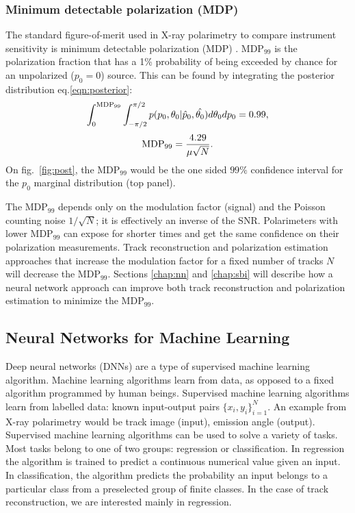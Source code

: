 \subsubsection{Minimum detectable polarization (MDP)}
\label{sec:mdp}

The standard figure-of-merit used in X-ray polarimetry to compare instrument sensitivity is minimum detectable polarization (MDP) \citep{weisskopf_understanding_2010}. MDP$_{99}$ is the polarization fraction that has a 1\% probability of being exceeded by chance for an unpolarized ($p_0 = 0$) source. This can be found by integrating the posterior distribution eq.\ref{eqn:posterior}:
\begin{equation}
    \int_0^{\rm MDP_{99}} \int_{-\pi/2}^{\pi/2} p(p_0, \theta_0 | \hat{p}_0, \hat{\theta_0})d\theta_0 dp_0 = 0.99,
\end{equation}
\begin{equation}
    {\rm MDP}_{99} = \frac{4.29}{\mu\sqrt{N}}.
\end{equation}
On fig.~\ref{fig:post}, the MDP$_{99}$ would be the one sided $99\%$ confidence interval for the $p_0$ marginal distribution (top panel).

The MDP$_{99}$ depends only on the modulation factor (signal) and the Poisson counting noise $1/\sqrt{N}$; it is effectively an inverse of the SNR. Polarimeters with lower MDP$_{99}$ can expose for shorter times and get the same confidence on their polarization measurements. Track reconstruction and polarization estimation approaches that increase the modulation factor for a fixed number of tracks $N$ will decrease the MDP$_{99}$. Sections \ref{chap:nn} and \ref{chap:sbi} will describe how a neural network approach can improve both track reconstruction and polarization estimation to minimize the MDP$_{99}$.

\subsection{Neural Networks for Machine Learning}

Deep neural networks (DNNs) are a type of supervised machine learning algorithm. Machine learning algorithms learn from data, as opposed to a fixed algorithm programmed by human beings. Supervised machine learning algorithms learn from labelled data: known input-output pairs $\{x_i,y_i\}^N_{i=1}$. An example from X-ray polarimetry would be track image (input), emission angle (output). Supervised machine learning algorithms can be used to solve a variety of tasks. Most tasks belong to one of two groups: regression or classification. In regression the algorithm is trained to predict a continuous numerical value given an input. In classification, the algorithm predicts the probability an input belongs to a particular class from a preselected group of finite classes. In the case of track reconstruction, we are interested mainly in regression.

